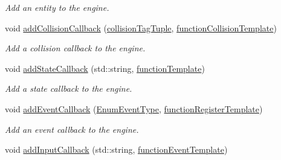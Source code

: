 \begin{DoxyCompactItemize}
\begin{DoxyCompactList}\small\item\em Add an entity to the engine. \end{DoxyCompactList}\item 
\hypertarget{class_army_engine_ab8eaf903f7c7d5415ec34e3f985e6328}{void \hyperlink{class_army_engine_ab8eaf903f7c7d5415ec34e3f985e6328}{add\-Collision\-Callback} (\hyperlink{_collision_manager_8h_a59fec3c97983b1c074529cfdd245515a}{collision\-Tag\-Tuple}, \hyperlink{_collision_manager_8h_a141eae5ec36e58aae61b3cb494451210}{function\-Collision\-Template})}\label{d4/d9d/class_army_engine_ab8eaf903f7c7d5415ec34e3f985e6328}

\begin{DoxyCompactList}\small\item\em Add a collision callback to the engine. \end{DoxyCompactList}\item 
\hypertarget{class_army_engine_ae942a6f5f5dafd2d6f67671d3c8016bd}{void \hyperlink{class_army_engine_ae942a6f5f5dafd2d6f67671d3c8016bd}{add\-State\-Callback} (std\-::string, \hyperlink{_callback_manager_8h_a73a0c6254a0b5ab661ca1f3bd5f3d99c}{function\-Template})}\label{d4/d9d/class_army_engine_ae942a6f5f5dafd2d6f67671d3c8016bd}

\begin{DoxyCompactList}\small\item\em Add a state callback to the engine. \end{DoxyCompactList}\item 
\hypertarget{class_army_engine_aabdc47d50ce1c821fa23a44939bf5626}{void \hyperlink{class_army_engine_aabdc47d50ce1c821fa23a44939bf5626}{add\-Event\-Callback} (\hyperlink{_army_engine_8h_a696053605a0b27bfc265da70b5a70453}{Enum\-Event\-Type}, \hyperlink{_army_engine_8h_a159c12b96350841dc66f26d871738d24}{function\-Register\-Template})}\label{d4/d9d/class_army_engine_aabdc47d50ce1c821fa23a44939bf5626}

\begin{DoxyCompactList}\small\item\em Add an event callback to the engine. \end{DoxyCompactList}\item 
\hypertarget{class_army_engine_a6ae6547c3959043801392e0cfb6c78e6}{void \hyperlink{class_army_engine_a6ae6547c3959043801392e0cfb6c78e6}{add\-Input\-Callback} (std\-::string, \hyperlink{_callback_manager_8h_a3459e948765053b6cb9e3b0b5efb5906}{function\-Event\-Template})}\label{d4/d9d/class_army_engine_a6ae6547c3959043801392e0cfb6c78e6}


\end{DoxyCompactItemize}
